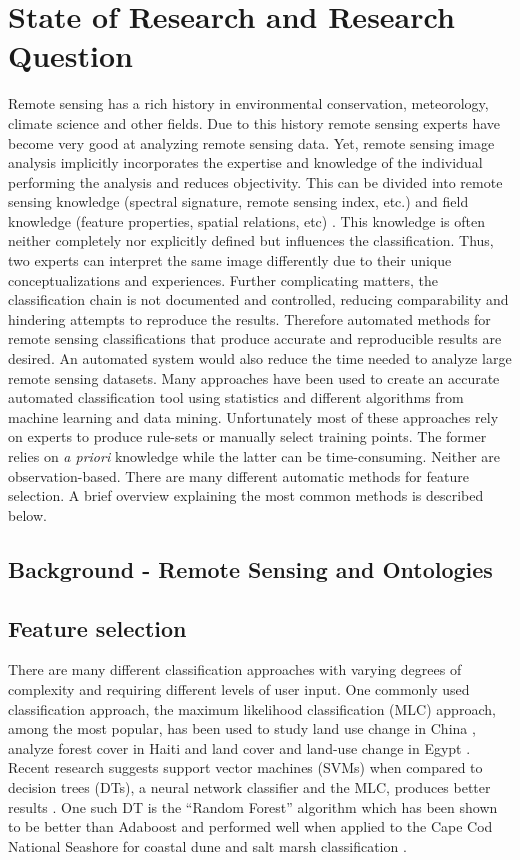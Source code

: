 \documentclass[authoryear, review,12pt,number]{elsarticle}
\begin{document}
\section{State of Research and Research Question}
Remote sensing has a rich history in environmental conservation, meteorology,
climate science and other fields. Due to this history remote sensing experts
have become very good at analyzing remote sensing data. Yet, remote sensing
image analysis implicitly incorporates the expertise and knowledge of the
individual performing the analysis and reduces objectivity. This can be divided
into remote sensing knowledge (spectral signature, remote sensing index, etc.)
and field knowledge (feature properties, spatial relations, etc)
\citep{Andres2013a}. This knowledge is often neither completely nor explicitly
defined but influences the classification. Thus, two experts can interpret the
same image differently due to their unique conceptualizations and experiences.
Further complicating matters, the classification chain is not documented and
controlled, reducing comparability and hindering attempts to reproduce the
results\citep{Arvor2013}. Therefore automated methods for remote sensing
classifications that produce accurate and reproducible results are desired.
An automated system would also reduce the time needed to analyze large
remote sensing datasets. Many approaches have been used to create an accurate
automated classification tool using statistics and different algorithms
from machine learning and data mining. Unfortunately most of these approaches
rely on experts to produce rule-sets or manually select training points. The
former relies on \emph{a priori} knowledge while the latter can be
time-consuming.
Neither are observation-based. There are many different automatic methods
for feature selection. A brief overview explaining the most common methods is
described below.

\subsection{Background - Remote Sensing and Ontologies}

\subsection{Feature selection}

There are many different classification approaches with varying degrees of
complexity and requiring different levels of user input. One commonly used
classification approach, the maximum likelihood classification (MLC) approach,
among the most popular, has been used to study land use change in China
\citep{Ding2007}, analyze forest cover in Haiti \citep{Churches2014} and land
cover and land-use change in Egypt \citep{Shalaby2007}. Recent research suggests
support vector machines (SVMs) when compared to decision trees (DTs), a neural
network classifier and the MLC, produces better results \citep{Huang2002}. One
such DT is the ``Random Forest'' algorithm which has been shown to be better
than Adaboost \citep{Chan2008} and performed well when applied to the Cape Cod
National Seashore for coastal dune and salt marsh classification
\citep{Timm2012}.
\end{document}
